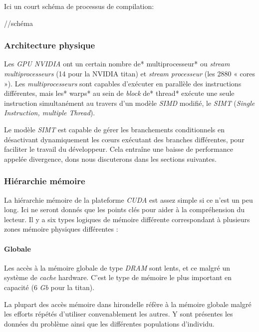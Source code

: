 \documentclass[french, 11pt]{memoir}
\begin{document}
Ici un court schéma de processus de compilation:

//schéma

\subsubsection{Architecture physique}\label{architecture-physique}

Les \emph{GPU NVIDIA} ont un certain nombre de* multiprocesseur* ou
\emph{stream multiprocesseurs} (14 pour la NVIDIA titan) et \emph{stream
	processeur} (les 2880 « cores »). Les \emph{multiprocesseurs} sont
capables d'exécuter en parallèle des instructions différentes, mais les*
warps* au sein de \emph{block} de* thread* exécute une seule instruction
simultanément au travers d'un modèle \emph{SIMD} modifié, le \emph{SIMT}
(\emph{Single Instruction, multiple Thread}).

Le modèle \emph{SIMT} est capable de gérer les branchements
conditionnels en désactivant dynamiquement les cœurs exécutant des
branches différentes, pour faciliter le travail du développeur. Cela
entraîne une baisse de performance appelée divergence, dons nous
discuterons dans les sections suivantes.

\subsubsection{Hiérarchie mémoire}\label{hiuxe9rarchie-muxe9moire}

La hiérarchie mémoire de la plateforme \emph{CUDA} est assez simple si
ce n'est un peu long. Ici ne seront donnés que les points clés pour
aider à la compréhension du lecteur. Il y a six types logiques de
mémoire différente correspondant à plusieurs zones mémoire physiques
différentes :

\paragraph{Globale}\label{globale}

Les accès à la mémoire globale de type \emph{DRAM} sont lents, et ce
malgré un système de \emph{cache} hardware. C'est le type de mémoire le
plus important en capacité (6 \emph{Gb} pour la titan).

La plupart des accès mémoire dans hirondelle réfère à la mémoire globale
malgré les efforts répétés d'utiliser convenablement les autres. Y sont
présentes les données du problème ainsi que les différentes populations
d'individu.
\end{document}
